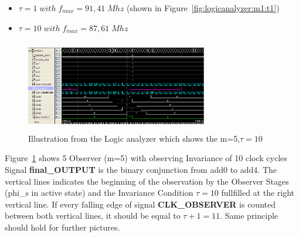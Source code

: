 \begin{itemize}
 \item $\tau = 1 \;with\; f_{max}=91,41\;Mhz$ (shown in Figure~\ref{fig:logicanalyzer:m1:t1})
 \item $\tau = 10 \;with\; f_{max}=87,61\;Mhz$ 
\end{itemize}

\begin{figure}[]
\centering
\includegraphics[width=300px,height=150px]{../../pictures/Logicanalyzer/5_Observer_Tau_10.png}
\caption[Logicanalyzer m=5,$\tau = 10$]{Illustration from the Logic analyzer which shows the m=5,$\tau = 10$}
\label{fig:logicanalyzer:m5:t10}
\end{figure}

Figure~\ref{fig:logicanalyzer:m5:t10} shows 5 Observer (m=5) with observing Invariance of 10 clock cycles\\
Signal \textbf{final\_OUTPUT} is the binary conjunction from add0 to add4. 
The vertical lines indicates the beginning of the observation by the Observer Stages (phi\_s in active state) and 
the Invariance Condition $\tau = 10$ fullfilled at the right vertical line. If every falling edge of signal \textbf{CLK\_OBSERVER} is counted
between both vertical lines, it should be equal to $\tau + 1 = 11$. Same principle should hold for further pictures. 


